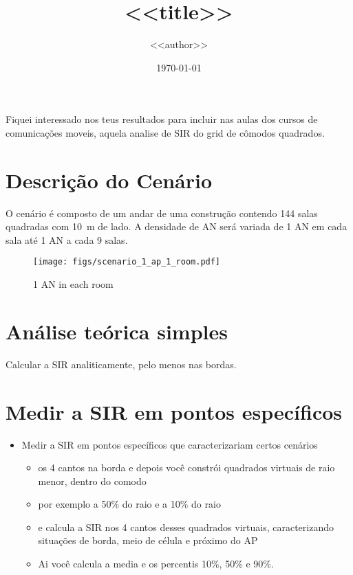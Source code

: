 \documentclass{article}
\title{<<title>>}
\author{<<author>>}
\date{\today}
\begin{document}
\maketitle


Fiquei interessado nos teus resultados para incluir nas aulas dos cursos de
comunicações moveis, aquela analise de SIR do grid de cômodos quadrados.

\section{Descrição do Cenário}

O cenário é composto de um andar de uma construção contendo \num{144} salas
quadradas com \SI{10}{m} de lado. A densidade de AN será variada de 1
AN em cada sala até 1 AN a cada \num{9} salas.

\begin{figure}[!ht]
  \centering
  \texttt{[image: figs/scenario\_1\_ap\_1\_room.pdf]}
  \caption{1 AN in each room}\label{fig:1_an_each_room}
\end{figure}

\section{Análise teórica simples}

Calcular a SIR analiticamente, pelo menos nas bordas.

\section{Medir a SIR em pontos
específicos}

\begin{itemize}
\itemsep1pt\parskip0pt
\item
  Medir a SIR em pontos específicos que caracterizariam certos cenários

  \begin{itemize}
  \itemsep1pt\parskip0pt
  \item
    os 4 cantos na borda e depois você constrói quadrados virtuais de
    raio menor, dentro do comodo
  \item
    por exemplo a 50\% do raio e a 10\% do raio
  \item
    e calcula a SIR nos 4 cantos desses quadrados virtuais,
    caracterizando situações de borda, meio de célula e próximo do AP
  \item
    Ai você calcula a media e os percentis 10\%, 50\% e 90\%.
  \end{itemize}
\end{itemize}
\end{document}
